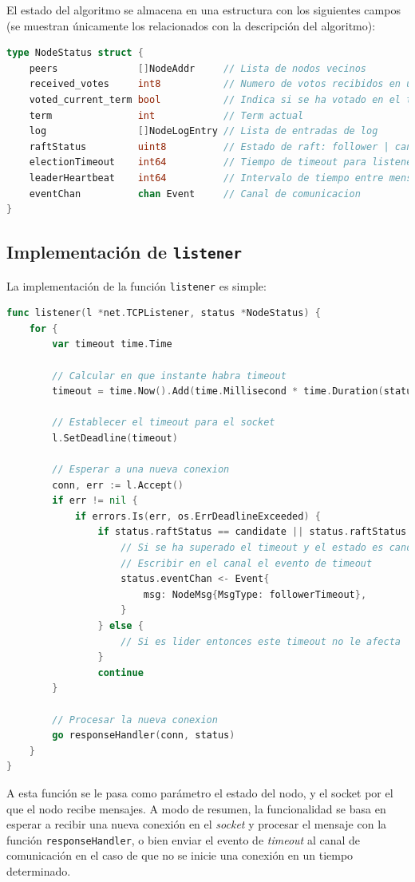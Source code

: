 El estado del algoritmo se almacena en una estructura con los siguientes campos (se muestran únicamente los relacionados con la descripción del algoritmo):

\begin{lstlisting}[language=go]
type NodeStatus struct {
	peers              []NodeAddr     // Lista de nodos vecinos
	received_votes     int8           // Numero de votos recibidos en una eleccion
	voted_current_term bool           // Indica si se ha votado en el term acutal
	term               int            // Term actual
	log                []NodeLogEntry // Lista de entradas de log
	raftStatus         uint8          // Estado de raft: follower | candidate | leader
	electionTimeout    int64          // Tiempo de timeout para listener()
	leaderHeartbeat    int64          // Intervalo de tiempo entre mensajes para leaderHeartbeats()
	eventChan          chan Event     // Canal de comunicacion
}
\end{lstlisting}

\subsection{Implementación de \texttt{listener}}

La implementación de la función \texttt{listener} es simple:

\begin{lstlisting}[language=go]
func listener(l *net.TCPListener, status *NodeStatus) {
	for {
		var timeout time.Time
		
		// Calcular en que instante habra timeout
		timeout = time.Now().Add(time.Millisecond * time.Duration(status.electionTimeout))
		
		// Establecer el timeout para el socket
		l.SetDeadline(timeout)

		// Esperar a una nueva conexion
		conn, err := l.Accept()
		if err != nil {
			if errors.Is(err, os.ErrDeadlineExceeded) {
				if status.raftStatus == candidate || status.raftStatus == follower {
					// Si se ha superado el timeout y el estado es candidate o follower
					// Escribir en el canal el evento de timeout
					status.eventChan <- Event{
						msg: NodeMsg{MsgType: followerTimeout},
					}
				} else {
					// Si es lider entonces este timeout no le afecta
				}
				continue
		}
		
		// Procesar la nueva conexion
		go responseHandler(conn, status)
	}
}
\end{lstlisting}

A esta función se le pasa como parámetro el estado del nodo, y el socket por el que el nodo recibe mensajes. A modo de resumen, la funcionalidad se basa en esperar a recibir una nueva conexión en el \textit{socket} y procesar el mensaje con la función \texttt{responseHandler}, o bien enviar el evento de \textit{timeout} al canal de comunicación en el caso de que no se inicie una conexión en un tiempo determinado.

